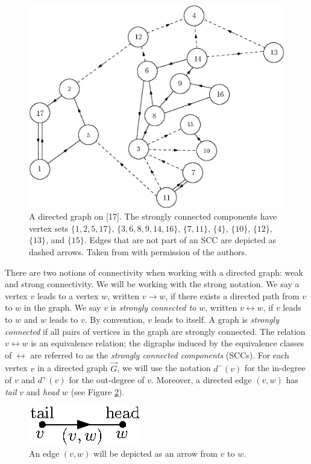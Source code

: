 \begin{figure}
    \centering
    \includegraphics[scale=0.6]{Content/Pictures/Fig1.eps}
    \caption{A directed graph on [17]. The strongly connected components have vertex sets $\{1,2,5,17\}$, $\{3,6,8,9,14,16\}$, $\{7,11\}$, $\{4\}$, $\{10\}$, $\{12\}$, $\{13\}$, and $\{15\}$. Edges that are not part of an SCC are depicted as dashed arrows. Taken from \cite{goldschmidtScalingLimitCritical2019} with permission of the authors.}
    \label{fig.SCCs}
\end{figure}

There are two notions of connectivity when working with a directed graph: weak and strong connectivity. We will be working with the strong notation. We say a vertex $v$ leads to a vertex $w$, written $v \rightarrow w$, if there exists a directed path from $v$ to $w$ in the graph. We say $v$ is \emph{strongly connected to $w$}, written $v \leftrightarrow w$, if $v$ leads to $w$ and $w$ leads to $v$. By convention, $v$ leads to itself. A graph is \emph{strongly connected} if all pairs of vertices in the graph are strongly connected. The relation $v \leftrightarrow w$ is an equivalence relation; the digraphs induced by the equivalence classes of $\leftrightarrow$ are referred to as the \emph{strongly connected components} (SCCs). For each vertex $v$ in a directed graph $\vec{G}$, we will use the notation $d^-(v)$ for the in-degree of $v$ and $d^+(v)$ for the out-degree of $v$. Moreover, a directed edge $(v,w)$ has \emph{tail} $v$ and \emph{head} $w$ (see Figure \ref{fig.tailhead}).
\begin{figure}
    \centering
    \includegraphics{Content/Pictures/Fig2.eps}
    \caption{An edge $(v,w)$ will be depicted as an arrow from $v$ to $w$.}\label{fig.tailhead}
\end{figure}


